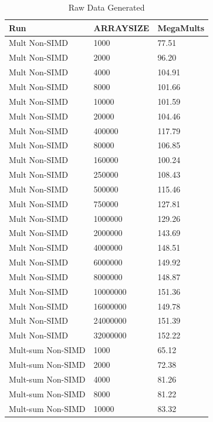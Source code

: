 \documentclass{article}
\begin{document}
\begin{longtable}{|l|l|l|}
\caption{Raw Data Generated}\label{tab:Data}\\
\hline
Run               & ARRAYSIZE & MegaMults \\ \hline
Mult Non-SIMD     & 1000      & 77.51     \\ \hline
Mult Non-SIMD     & 2000      & 96.20     \\ \hline
Mult Non-SIMD     & 4000      & 104.91    \\ \hline
Mult Non-SIMD     & 8000      & 101.66    \\ \hline
Mult Non-SIMD     & 10000     & 101.59    \\ \hline
Mult Non-SIMD     & 20000     & 104.46    \\ \hline
Mult Non-SIMD     & 400000    & 117.79    \\ \hline
Mult Non-SIMD     & 80000     & 106.85    \\ \hline
Mult Non-SIMD     & 160000    & 100.24    \\ \hline
Mult Non-SIMD     & 250000    & 108.43    \\ \hline
Mult Non-SIMD     & 500000    & 115.46    \\ \hline
Mult Non-SIMD     & 750000    & 127.81    \\ \hline
Mult Non-SIMD     & 1000000   & 129.26    \\ \hline
Mult Non-SIMD     & 2000000   & 143.69    \\ \hline
Mult Non-SIMD     & 4000000   & 148.51    \\ \hline
Mult Non-SIMD     & 6000000   & 149.92    \\ \hline
Mult Non-SIMD     & 8000000   & 148.87    \\ \hline
Mult Non-SIMD     & 10000000  & 151.36    \\ \hline
Mult Non-SIMD     & 16000000  & 149.78    \\ \hline
Mult Non-SIMD     & 24000000  & 151.39    \\ \hline
Mult Non-SIMD     & 32000000  & 152.22    \\ \hline
Mult-sum Non-SIMD & 1000      & 65.12     \\ \hline
Mult-sum Non-SIMD & 2000      & 72.38     \\ \hline
Mult-sum Non-SIMD & 4000      & 81.26     \\ \hline
Mult-sum Non-SIMD & 8000      & 81.22     \\ \hline
Mult-sum Non-SIMD & 10000     & 83.32     \\ \hline

\end{longtable}
\end{document}
